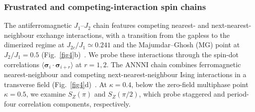 \documentclass[pdflatex,sn-nature]{sn-jnl}%
\theoremstyle{thmstyleone}%
\theoremstyle{thmstyletwo}%
\theoremstyle{thmstylethree}%
\begin{document}
\subsubsection{Frustrated and competing-interaction spin chains}





The antiferromagnetic $J_1$--$J_2$ chain features competing nearest- and next-nearest-neighbour exchange interactions, with a transition from the gapless to the dimerized regime at $J_{2c}/J_1\simeq0.241$ and the Majumdar--Ghosh (MG) point at $J_2/J_1=0.5$ (Fig.~\ref{fig4}b)~\cite{okamoto1992fluid, majumdar1969next2}. We probe these interactions through the spin-dot correlations $\langle\boldsymbol{\sigma}_i\cdot\boldsymbol{\sigma}_{i+r}\rangle$ at $r=1,2$. The ANNNI chain combines ferromagnetic nearest-neighbour and competing next-nearest-neighbour Ising interactions in a transverse field (Fig.~\ref{fig4}d)~\cite{beccaria2006density, chandra2007floating}. At $\kappa=0.4$, below the zero-field multiphase point $\kappa=0.5$, we examine $S_Z(\pi)$ and $S_Z(\pi/2)$, which probe staggered and period-four correlation components, respectively.
\end{document}
